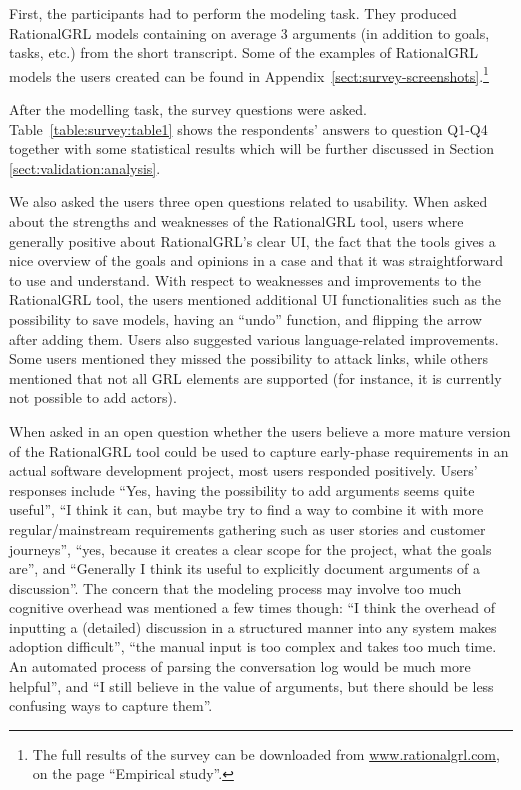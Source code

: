 First, the participants had to perform the modeling task. They produced RationalGRL models containing on average 3 arguments (in addition  to goals, tasks, etc.) from the short transcript. Some of the examples of RationalGRL models the users created can be found in Appendix~\ref{sect:survey-screenshots}.\footnote{The full results of the survey can be downloaded from \url{www.rationalgrl.com}, on the page ``Empirical study''.}

After the modelling task, the survey questions were asked. Table~\ref{table:survey:table1} shows the respondents' answers to question Q1-Q4 together with some statistical results which will be further discussed in Section \ref{sect:validation:analysis}. 

We also asked the users three open questions related to usability. When asked about the strengths and weaknesses of the RationalGRL tool, users where generally positive about RationalGRL's clear UI, the fact that the tools gives a nice overview of the goals and opinions in a case and that it was straightforward to use and understand. With respect to weaknesses and improvements to the RationalGRL tool, the users mentioned additional UI functionalities such as the possibility to save models, having an ``undo'' function, and flipping the arrow after adding them. Users also suggested various language-related improvements. Some users mentioned they missed the possibility to attack links, while others mentioned that not all GRL elements are supported (for instance, it is currently not possible to add actors).

When asked in an open question whether the users believe a more mature version of the RationalGRL tool could be used to capture early-phase requirements in an actual software development project, most users responded positively. Users' responses include ``Yes, having the possibility to add arguments seems quite useful'', ``I think it can, but maybe try to find a way to combine it with more regular/mainstream requirements gathering such as user stories and customer journeys'', ``yes, because it creates a clear scope for the project, what the goals are'', and ``Generally I think its useful to explicitly document arguments of a discussion''. The concern that the modeling process may involve too much cognitive overhead was mentioned a few times though: ``I think the overhead of inputting a (detailed) discussion in a structured manner into any system makes adoption difficult'', ``the manual input is too complex and takes too much time. An automated process of parsing the conversation log would be much more helpful'', and ``I still believe in the value of arguments, but there should be less confusing ways to capture them''.

